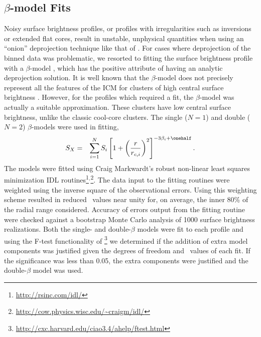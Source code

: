 \documentclass{emulateapj}
\begin{document}
\subsection{$\beta$-model Fits}
\label{sec:beta}

Noisy surface brightness profiles, or profiles with irregularities
such as inversions or extended flat cores, result in unstable,
unphysical quantities when using an ``onion'' deprojection technique
like that of \citet{kriss83}. For cases where deprojection of the
binned data was problematic, we resorted to fitting the surface
brightness profile with a $\beta$-model \citep{1978A&A....70..677C},
which has the positive attribute of having an analytic deprojection
solution. It is well known that the $\beta$-model does not precisely
represent all the features of the ICM for clusters of high central
surface brightness \citep{2000MNRAS.311..313E, 2002ApJ...579..571L,
  2007ApJ...665..911H}. However, for the profiles which required a
fit, the $\beta$-model was actually a suitable approximation. These
clusters have low central surface brightness, unlike the classic
cool-core clusters. The single ($N=1$) and double ($N=2$)
$\beta$-models were used in fitting,
\begin{eqnarray}
S_X &=& \displaystyle\sum_{i=1}^N S_i
\left[1+\left(\frac{r}{r_{c,i}}\right)^2\right]^{-3\beta_i+\onehalf}.
\end{eqnarray}
The models were fitted using Craig Markwardt's robust non-linear least
squares minimization IDL
routines\footnote{\url{http://rsinc.com/idl/}}$^{,}$\footnote{\url{http://cow.physics.wisc.edu/~craigm/idl/}}. The
data input to the fitting routines were weighted using the inverse
square of the observational errors. Using this weighting scheme
resulted in reduced \chisq\ values near unity for, on average, the
inner 80\% of the radial range considered. Accuracy of errors output
from the fitting routine were checked against a bootstrap Monte Carlo
analysis of 1000 surface brightness realizations. Both the single- and
double-$\beta$ models were fit to each profile and using the F-test
functionality of
\sherpa\footnote{\url{http://cxc.harvard.edu/ciao3.4/ahelp/ftest.html}}
we determined if the addition of extra model components was justified
given the degrees of freedom and \chisq\ values of each fit. If the
significance was less than 0.05, the extra components were justified
and the double-$\beta$ model was used.
\end{document}
